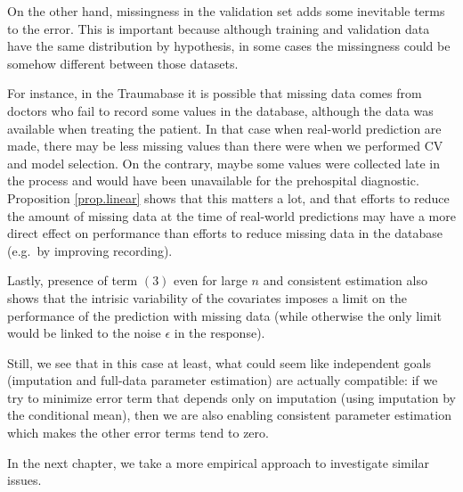 On the other hand, missingness in the validation set adds some inevitable terms to the error. This is important because although training and validation data have the same distribution by hypothesis, in some cases the missingness could be somehow different between those datasets. 

For instance, in the Traumabase it is possible that missing data comes from doctors who fail to record some values in the database, although the data was available when treating the patient. In that case when real-world prediction are made, there may be less missing values than there were when we performed CV and model selection. On the contrary, maybe some values were collected late in the process and would have been unavailable for the prehospital diagnostic. Proposition \ref{prop.linear} shows that this matters a lot, and that efforts to reduce the amount of missing data at the time of real-world predictions may have a more direct effect on performance than efforts to reduce missing data in the database (e.g.\ by improving recording). 

Lastly, presence of term $(3)$ even for large $n$ and consistent estimation also shows that the intrisic variability of the covariates imposes a limit on the performance of the prediction with missing data (while otherwise the only limit would be linked to the noise $\epsilon$ in the response). 

Still, we see that in this case at least, what could seem like independent goals (imputation and full-data parameter estimation) are actually compatible: if we try to minimize error term that depends only on imputation (using imputation by the conditional mean), then we are also enabling consistent parameter estimation which makes the other error terms tend to zero.

In the next chapter, we take a more empirical approach to investigate similar issues.